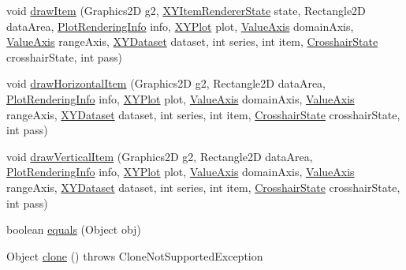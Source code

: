 \begin{DoxyCompactItemize}
\item 
void \mbox{\hyperlink{classorg_1_1jfree_1_1chart_1_1renderer_1_1xy_1_1_x_y_box_and_whisker_renderer_ab258adf4da2bff2035c5974a4853464f}{draw\+Item}} (Graphics2D g2, \mbox{\hyperlink{classorg_1_1jfree_1_1chart_1_1renderer_1_1xy_1_1_x_y_item_renderer_state}{X\+Y\+Item\+Renderer\+State}} state, Rectangle2D data\+Area, \mbox{\hyperlink{classorg_1_1jfree_1_1chart_1_1plot_1_1_plot_rendering_info}{Plot\+Rendering\+Info}} info, \mbox{\hyperlink{classorg_1_1jfree_1_1chart_1_1plot_1_1_x_y_plot}{X\+Y\+Plot}} plot, \mbox{\hyperlink{classorg_1_1jfree_1_1chart_1_1axis_1_1_value_axis}{Value\+Axis}} domain\+Axis, \mbox{\hyperlink{classorg_1_1jfree_1_1chart_1_1axis_1_1_value_axis}{Value\+Axis}} range\+Axis, \mbox{\hyperlink{interfaceorg_1_1jfree_1_1data_1_1xy_1_1_x_y_dataset}{X\+Y\+Dataset}} dataset, int series, int item, \mbox{\hyperlink{classorg_1_1jfree_1_1chart_1_1plot_1_1_crosshair_state}{Crosshair\+State}} crosshair\+State, int pass)
\item 
void \mbox{\hyperlink{classorg_1_1jfree_1_1chart_1_1renderer_1_1xy_1_1_x_y_box_and_whisker_renderer_aceb5c5e6820129f811b3fcea34943ee2}{draw\+Horizontal\+Item}} (Graphics2D g2, Rectangle2D data\+Area, \mbox{\hyperlink{classorg_1_1jfree_1_1chart_1_1plot_1_1_plot_rendering_info}{Plot\+Rendering\+Info}} info, \mbox{\hyperlink{classorg_1_1jfree_1_1chart_1_1plot_1_1_x_y_plot}{X\+Y\+Plot}} plot, \mbox{\hyperlink{classorg_1_1jfree_1_1chart_1_1axis_1_1_value_axis}{Value\+Axis}} domain\+Axis, \mbox{\hyperlink{classorg_1_1jfree_1_1chart_1_1axis_1_1_value_axis}{Value\+Axis}} range\+Axis, \mbox{\hyperlink{interfaceorg_1_1jfree_1_1data_1_1xy_1_1_x_y_dataset}{X\+Y\+Dataset}} dataset, int series, int item, \mbox{\hyperlink{classorg_1_1jfree_1_1chart_1_1plot_1_1_crosshair_state}{Crosshair\+State}} crosshair\+State, int pass)
\item 
void \mbox{\hyperlink{classorg_1_1jfree_1_1chart_1_1renderer_1_1xy_1_1_x_y_box_and_whisker_renderer_acd6a5f3b6f9a01d5b82784fb006b2fa9}{draw\+Vertical\+Item}} (Graphics2D g2, Rectangle2D data\+Area, \mbox{\hyperlink{classorg_1_1jfree_1_1chart_1_1plot_1_1_plot_rendering_info}{Plot\+Rendering\+Info}} info, \mbox{\hyperlink{classorg_1_1jfree_1_1chart_1_1plot_1_1_x_y_plot}{X\+Y\+Plot}} plot, \mbox{\hyperlink{classorg_1_1jfree_1_1chart_1_1axis_1_1_value_axis}{Value\+Axis}} domain\+Axis, \mbox{\hyperlink{classorg_1_1jfree_1_1chart_1_1axis_1_1_value_axis}{Value\+Axis}} range\+Axis, \mbox{\hyperlink{interfaceorg_1_1jfree_1_1data_1_1xy_1_1_x_y_dataset}{X\+Y\+Dataset}} dataset, int series, int item, \mbox{\hyperlink{classorg_1_1jfree_1_1chart_1_1plot_1_1_crosshair_state}{Crosshair\+State}} crosshair\+State, int pass)
\item 
boolean \mbox{\hyperlink{classorg_1_1jfree_1_1chart_1_1renderer_1_1xy_1_1_x_y_box_and_whisker_renderer_a9b1511f0bb270462bb502a0d03576da4}{equals}} (Object obj)
\item 
Object \mbox{\hyperlink{classorg_1_1jfree_1_1chart_1_1renderer_1_1xy_1_1_x_y_box_and_whisker_renderer_a3394177d12cd3db1034fab8dda97714b}{clone}} ()  throws Clone\+Not\+Supported\+Exception 
\end{DoxyCompactItemize}

